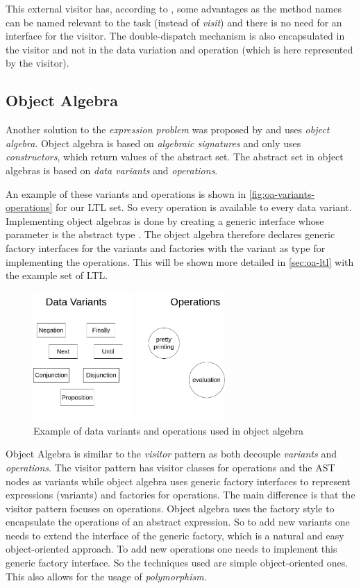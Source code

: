 \documentclass{llncs}
\begin{document}
This external visitor has, according to \cite{Parr09}, some advantages as the method names can be named relevant to the task (instead of \emph{visit}) and there is no need for an interface for the visitor. The double-dispatch mechanism is also encapsulated in the visitor and not in the data variation and operation (which is here represented by the visitor). 


\subsection{Object Algebra} \label{ssec:oa}
Another solution to the \emph{expression problem} was proposed by \cite{Oliveira12} and uses \emph{object algebra}. Object algebra is based on \emph{algebraic signatures} \cite{Guttag78} and only uses \emph{constructors}, which return values of the abstract set. The abstract set in object algebras is based on \emph{data variants} and \emph{operations}. 

An example of these variants and operations is shown in \autoref{fig:oa-variants-operations} for our LTL set. So every operation is available to every data variant. Implementing object algebras is done by creating a generic interface whose parameter is the abstract type \cite{Oliveira12}. The object algebra therefore declares generic factory interfaces for the variants and factories with the variant as type for implementing the operations. This will be shown more detailed in \autoref{sec:oa-ltl} with the example set of LTL.

\begin{figure}[h]
	\centering
	\includegraphics[width=0.65\textwidth]{img/OA-Variants-Operations}
	\caption{Example of data variants and operations used in object algebra}
	\label{fig:oa-variants-operations}
\end{figure} 

Object Algebra is similar to the \emph{visitor} pattern as both decouple \emph{variants} and \emph{operations}. The visitor pattern has visitor classes for operations and the AST nodes as variants while object algebra uses generic factory interfaces to represent expressions (variants) and factories for operations. The main difference is that the visitor pattern focuses on operations. Object algebra uses the factory style to encapsulate the operations of an abstract expression. So to add new variants one needs to extend the interface of the generic factory, which is a natural and easy object-oriented approach. To add new operations one needs to implement this generic factory interface. So the techniques used are simple object-oriented ones. This also allows for the usage of \emph{polymorphism}.
\end{document}
